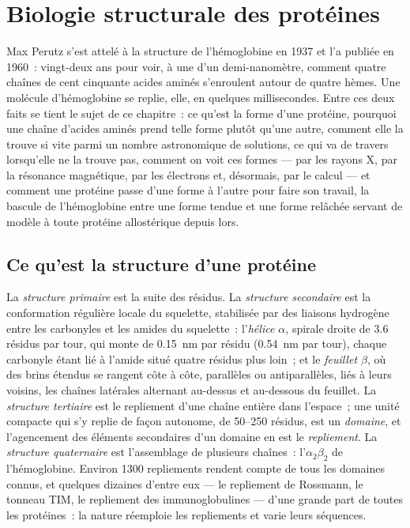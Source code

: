 \chapter{Biologie structurale des protéines}\label{ch:b3:structural-biology}

Max Perutz s'est attelé à la structure de l'hémoglobine en 1937 et l'a
publiée en 1960~: vingt-deux ans pour voir, à une  d'un
demi-nanomètre, comment quatre chaînes de cent cinquante acides aminés
s'enroulent autour de quatre hèmes. Une molécule d'hémoglobine se
replie, elle, en quelques millisecondes. Entre ces deux faits se tient
le sujet de ce chapitre~: ce qu'est la forme d'une protéine, pourquoi
une chaîne d'acides aminés prend telle forme plutôt qu'une autre,
comment elle la trouve si vite parmi un nombre astronomique de
solutions, ce qui va de travers lorsqu'elle ne la trouve pas, comment
on voit ces formes --- par les rayons X, par la résonance magnétique,
par les électrons et, désormais, par le calcul --- et comment une
protéine passe d'une forme à l'autre pour faire son travail, la
bascule de l'hémoglobine entre une forme tendue et une forme relâchée
servant de modèle à toute protéine allostérique depuis lors.

\section{Ce qu'est la structure d'une protéine}

\begin{definition}\label{def:b3:structural-biology:levels}
La \emph{structure primaire} est la suite des résidus. La
\emph{structure secondaire} est la conformation régulière locale du
squelette, stabilisée par des liaisons hydrogène entre les carbonyles
et les amides du squelette~: l'\emph{hélice $\alpha$}, spirale droite
de $3.6$ résidus par tour, qui monte de \qty{0.15}{nm} par résidu
(\qty{0.54}{nm} par tour), chaque carbonyle étant lié à l'amide situé
quatre résidus plus loin~; et le \emph{feuillet $\beta$}, où des brins
étendus se rangent côte à côte, parallèles ou antiparallèles, liés à
leurs voisins, les chaînes latérales alternant au-dessus et au-dessous
du feuillet. La \emph{structure tertiaire} est le repliement d'une
chaîne entière dans l'espace~; une unité compacte qui s'y replie de
façon autonome, de \numrange{50}{250} résidus, est un \emph{domaine},
et l'agencement des éléments secondaires d'un domaine en est le
\emph{repliement}. La \emph{structure quaternaire} est l'assemblage de
plusieurs chaînes~: l'$\alpha_{2}\beta_{2}$ de l'hémoglobine. Environ
\num{1300} repliements rendent compte de tous les domaines connus, et
quelques dizaines d'entre eux --- le repliement de Rossmann, le
tonneau TIM, le repliement des immunoglobulines --- d'une grande part
de toutes les protéines~: la nature réemploie les repliements et varie
leurs séquences.
\end{definition}

